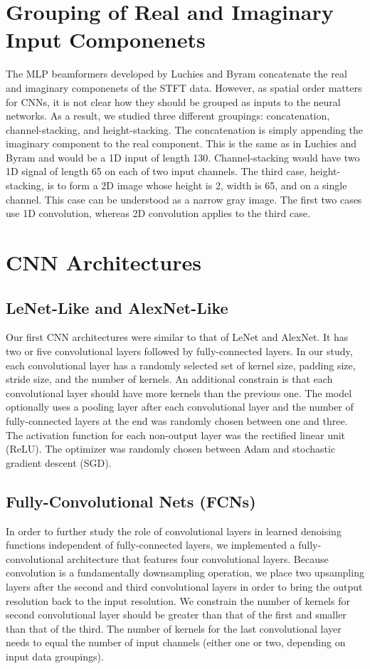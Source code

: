 \section{Grouping of Real and Imaginary Input Componenets}
The MLP beamformers developed by Luchies and Byram concatenate the real and imaginary componenets of the STFT data. However, as spatial order matters for CNNs, it is not clear how they should be grouped as inputs to the neural networks. As a result, we studied three different groupings: concatenation, channel-stacking, and height-stacking. The concatenation is simply appending the imaginary component to the real component. This is the same as in Luchies and Byram and would be a 1D input of length 130. Channel-stacking would have two 1D signal of length 65 on each of two input channels. The third case, height-stacking, is to form a 2D image whose height is 2, width is 65, and on a single channel. This case can be understood as a narrow gray image. The first two cases use 1D convolution, whereas 2D convolution applies to the third case.


\section{CNN Architectures}
  \subsection{LeNet-Like and AlexNet-Like}
  Our first CNN architectures were similar to that of LeNet and AlexNet. It has two or five convolutional layers followed by fully-connected layers. In our study, each convolutional layer has a randomly selected set of kernel size, padding size, stride size, and the number of kernels. An additional constrain is that each convolutional layer should have more kernels than the previous one. The model optionally uses a pooling layer after each convolutional layer and the number of fully-connected layers at the end was randomly chosen between one and three. The activation function for each non-output layer was the rectified linear unit (ReLU). The optimizer was randomly chosen between Adam and stochastic gradient descent (SGD).


  \subsection{Fully-Convolutional Nets (FCNs)}

  In order to further study the role of convolutional layers in learned denoising functions independent of fully-connected layers, we implemented a fully-convolutional architecture that features four convolutional layers. Because convolution is a fundamentally downsampling operation, we place two upsampling layers after the second and third convolutional layers in order to bring the output resolution back to the input resolution. We constrain the number of kernels for second convolutional layer should be greater than that of the first and smaller than that of the third. The number of kernels for the last convolutional layer needs to equal the number of input channels (either one or two, depending on input data groupings).

